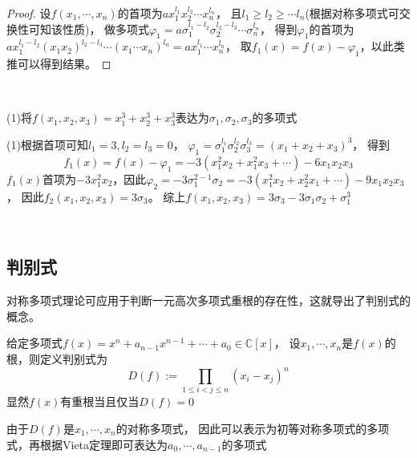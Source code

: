 \begin{proof}
  设$f(x_1,\cdots,x_n)$的首项为$ax_1^{l_1}x_2^{l_2}\cdots x_n^{l_n}$，
  且$l_1 \geq l_2 \geq \cdots l_n$(根据对称多项式可交换性可知该性质)，
  做多项式$\varphi_1 = a\sigma_1^{l_1 - l_2} \sigma_2^{l_2 - l_3}\cdots \sigma_n^{l_n}$，
  得到$\varphi_1$的首项为$ax_1^{l_1 - l_2}(x_1x_2)^{l_2 - l_3}\cdots (x_1\cdots x_n)^{l_n} = ax_1^{l_1} \cdots x_n^{l_n}$，
  取$f_1(x) = f(x) - \varphi_1$，以此类推可以得到结果。
\end{proof}

~

\begin{exercise}
  (1)将$f(x_1,x_2,x_3) = x_1^3 + x_2^3 + x_3^3$表达为$\sigma_1,\sigma_2,\sigma_3$的多项式
\end{exercise}

\begin{solution}
  (1)根据首项可知$l_1 = 3, l_2 = l_3 = 0$，
  $\varphi_1 = \sigma_1^{l_1}\sigma_2^{l_2}\sigma_3^{l_3} = (x_1+x_2+x_3)^3$，
  得到
  \begin{equation*}
    f_1(x) = f(x) - \varphi_1 = -3(x_1^2 x_2 + x_1^2 x_3 + \cdots) - 6x_1x_2x_3
  \end{equation*}
  $f_1(x)$首项为$-3x_1^2 x_2$，因此$\varphi_2 = -3 \sigma_1^{2-1}\sigma_2 = -3(x_1^2x_2 + x_2^2 x_1 + \cdots) - 9 x_1x_2x_3$，
  因此$f_2(x_1,x_2,x_3) = 3 \sigma_3$。
  综上$f(x_1,x_2,x_3) = 3 \sigma_3 - 3 \sigma_1 \sigma_2 + \sigma_1^3$
\end{solution}

~

\subsection{判别式}

对称多项式理论可应用于判断一元高次多项式重根的存在性，这就导出了判别式的概念。

\begin{definition}[判别式]
  给定多项式$f(x) = x^n + a_{n-1}x^{n-1} + \cdots + a_0 \in \mathbb{C}[x]$，
  设$x_1,\cdots,x_n$是$f(x)$的根，则定义判别式为
  \begin{equation*}
    D(f) := \prod \limits_{1 \leq i < j \leq n}(x_i - x_j)^n
  \end{equation*}
  显然$f(x)$有重根当且仅当$D(f) = 0$
\end{definition}


\begin{theorem}[判别式的计算]
  由于$D(f)$是$x_1,\cdots,x_n$的对称多项式，
  因此可以表示为初等对称多项式的多项式，再根据Vieta定理即可表达为$a_0,\cdots,a_{n-1}$的多项式
\end{theorem}

